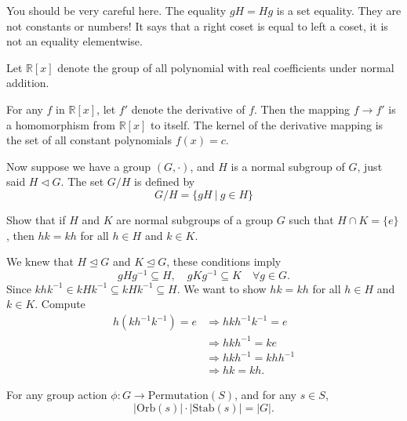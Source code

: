 You should be very careful here. The equality $gH = Hg$ is a set equality. They are not constants or numbers! It says that a 
right coset is equal to left a coset, it is not an equality elementwise.

\begin{example}
    Let $\mathbb{R}[x]$ denote the group of all polynomial with real coefficients under normal addition. 

    For any $f$ in $\mathbb{R}[x]$, let $f'$ denote the derivative of $f$. Then the mapping $f \to f'$ is a homomorphism from 
    $\mathbb{R}[x]$ to itself. The kernel of the derivative mapping is the set of all constant polynomials $f(x) = c$.
\end{example}

Now suppose we have a group $(G, \cdot)$, and $H$ is a normal subgroup of $G$, just said $H \vartriangleleft G$. The set $G/H$ is defined by 
\[
G/H = \{ gH \> | \> g \in H \}
\]

\begin{example}
    Show that if $H$ and $K$ are normal subgroups of a group $G$ such that $H \cap K = \{ e \}$, then 
    $hk = kh$ for all $h \in H$ and $k \in K$.
\end{example}
\begin{solution}
    We knew that $H \unlhd G$ and $K \unlhd G$, these conditions imply
    \[
        gHg^{-1} \subseteq H,\quad gKg^{-1} \subseteq K \quad \forall g \in G.
    \]
    Since $khk^{-1} \in kHk^{-1} \subseteq kHk^{-1}\subseteq H$. 
    We want to show $hk = kh$ for all $h \in H$ and $k \in K$. Compute 
    \begin{align*}
        h(kh^{-1}k^{-1}) = e &\Rightarrow hkh^{-1}k^{-1} = e\\
        &\Rightarrow hkh^{-1} = ke\\
        &\Rightarrow hkh^{-1} = khh^{-1}\\
        &\Rightarrow hk = kh.
    \end{align*}
\end{solution}

\begin{theorem}
    For any group action $\phi : G \to \text{Permutation}(S)$, and for any $s \in S$,
    \begin{equation}
        |\text{Orb}(s)| \cdot |\text{Stab}(s)| = |G|.
    \end{equation}
\end{theorem}

